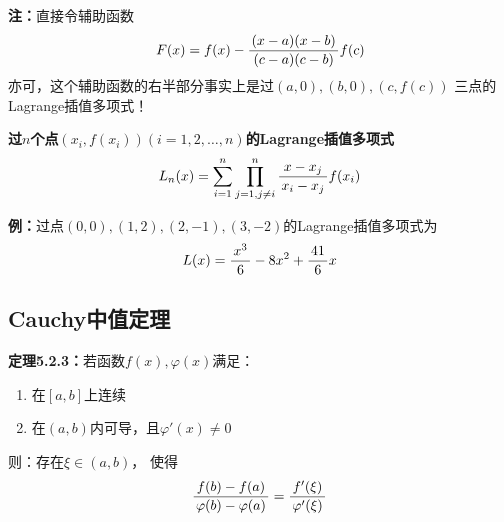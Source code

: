 {\bf 注：}直接令辅助函数
$$F(x)=f(x)-\displaystyle\frac{\,{(x-a)(x-b)}\,}{\,{(c-a)(c-b)}\,}f(c)$$
亦可，这个辅助函数的右半部分事实上是过$(a,0),(b,0),(c,f(c))$
三点的Lagrange插值多项式！

\begin{shaded}
{\bf 过$n$个点$(x_i,f(x_i))(i=1,2,\ldots,n)$的Lagrange插值多项式}
$$L_n(x)=\sum\limits_{i=1}^n\prod_{j=1,j\ne i}^{n}
\displaystyle\frac{\,{x-x_j}\,}{\,{x_i-x_j}\,}f(x_i)$$

{\bf 例：}过点$(0,0),(1,2),(2,-1),(3,-2)$的Lagrange插值多项式为
$$L(x)=\displaystyle\frac{\,{x^3}\,}{\,{6}\,}-8x^2+\displaystyle\frac{\,{41}\,}{\,{6}\,}x$$

\begin{center}
\end{center}


\end{shaded}

\subsection{Cauchy中值定理}

{\bf 定理5.2.3：}若函数$f(x),\varphi(x)$满足： 
\begin{enumerate}[(1)]
  \setlength{\itemindent}{1cm}
  \item 在$[a,b]$上连续 
  \item 在$(a,b)$内可导，且$\varphi'(x)\ne 0$ 
\end{enumerate}
则：存在$\xi\in(a,b)$， 使得
$$\displaystyle\frac{\,{f(b)-f(a)}\,}{\,{\varphi(b)-\varphi(a)}\,}=\displaystyle\frac{\,{f'(\xi)}\,}{\,{\varphi'(\xi)}\,}$$

